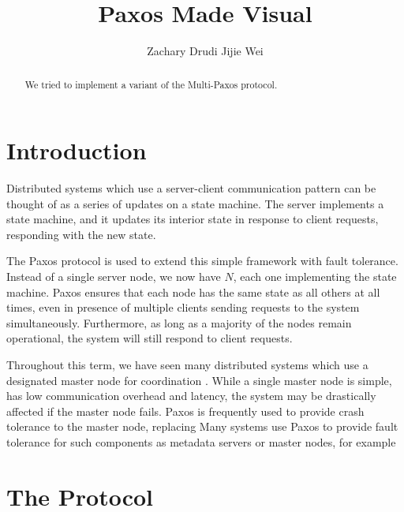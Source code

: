 \documentclass{sig-alternate}
\begin{document}
\title{Paxos Made Visual}


\author{
\alignauthor
Zachary Drudi  
\alignauthor
Jijie Wei		
}


\maketitle

\begin{abstract}
We tried to implement a variant of the Multi-Paxos protocol. 
\end{abstract}

\section{Introduction}
Distributed systems which use a server-client communication pattern can be thought of as a series of updates on a state machine. The server implements a state machine, and it updates its interior state in response to client requests, responding with the new state. 

The Paxos protocol is used to extend this simple framework with fault tolerance. Instead of a single server node, we now have $N$, each one implementing the state machine. Paxos ensures that each node has the same state as all others at all times, even in presence of multiple clients sending requests to the system simultaneously. Furthermore, as long as a majority of the nodes remain operational, the system will still respond to client requests.

Throughout this term, we have seen many distributed systems which use a designated master node for coordination \cite{dean2008mapreduce, ghemawat_google_2003}. While a single master node is simple, has low communication overhead and latency, the system may be drastically affected if the master node fails. Paxos is frequently used \cite{thekkath_frangipani:_1997, lee_petal:_1996, corbett_spanner:_2012, calder_windows_2011} to provide crash tolerance to the master node, replacing 
Many systems use Paxos to provide fault tolerance for such components as metadata servers or master nodes, for example 

\section{The Protocol}
\end{document}
